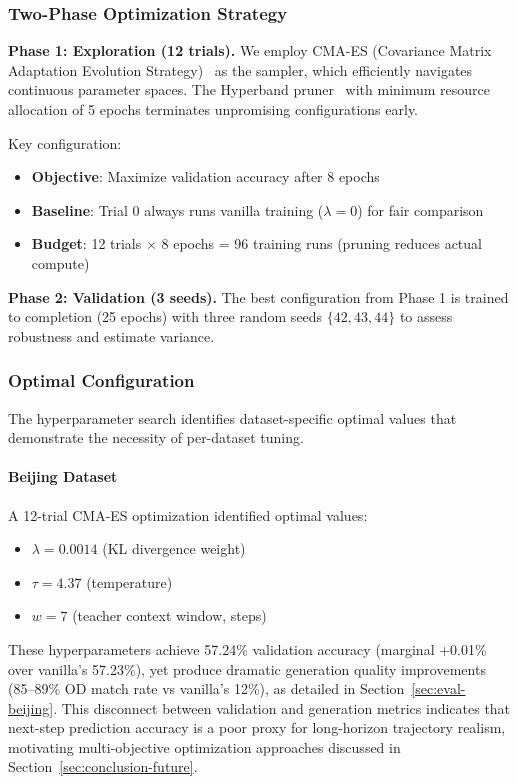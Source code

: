 \subsubsection{Two-Phase Optimization Strategy}

\textbf{Phase 1: Exploration (12 trials).} We employ CMA-ES (Covariance Matrix Adaptation Evolution Strategy)~\cite{hansenCMAEvolutionStrategy2023} as the sampler, which efficiently navigates continuous parameter spaces. The Hyperband pruner~\cite{liHyperbandNovelBanditBased2018} with minimum resource allocation of 5 epochs terminates unpromising configurations early.

Key configuration:
\begin{itemize}[noitemsep,topsep=0pt]
    \item \textbf{Objective}: Maximize validation accuracy after 8 epochs
    \item \textbf{Baseline}: Trial 0 always runs vanilla training ($\lambda = 0$) for fair comparison
    \item \textbf{Budget}: 12 trials $\times$ 8 epochs = 96 training runs (pruning reduces actual compute)
\end{itemize}

\textbf{Phase 2: Validation (3 seeds).} The best configuration from Phase 1 is trained to completion (25 epochs) with three random seeds $\{42, 43, 44\}$ to assess robustness and estimate variance.

\subsubsection{Optimal Configuration}

The hyperparameter search identifies dataset-specific optimal values that demonstrate the necessity of per-dataset tuning.

\paragraph{Beijing Dataset}
A 12-trial CMA-ES optimization identified optimal values:
\begin{itemize}[leftmargin=*,noitemsep]
    \item $\lambda = 0.0014$ (KL divergence weight)
    \item $\tau = 4.37$ (temperature)
    \item $w = 7$ (teacher context window, steps)
\end{itemize}
These hyperparameters achieve 57.24\% validation accuracy (marginal +0.01\% over vanilla's 57.23\%), yet produce dramatic generation quality improvements (85--89\% OD match rate vs vanilla's 12\%), as detailed in Section~\ref{sec:eval-beijing}. This disconnect between validation and generation metrics indicates that next-step prediction accuracy is a poor proxy for long-horizon trajectory realism, motivating multi-objective optimization approaches discussed in Section~\ref{sec:conclusion-future}.

